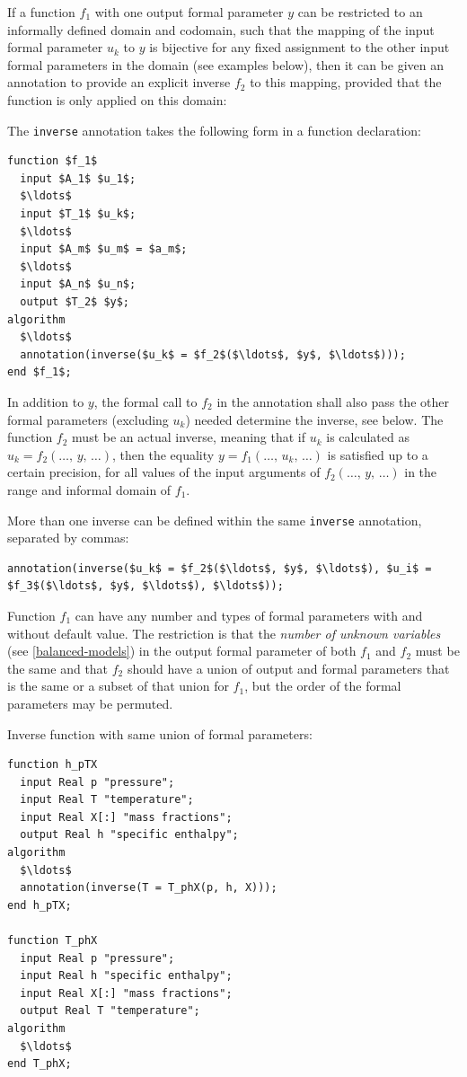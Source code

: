 If a function $f_1$ with one output formal parameter $y$ can be restricted to an informally defined domain and codomain, such that the mapping of the input formal parameter $u_{k}$ to $y$ is bijective for any fixed assignment to the other input formal parameters in the domain (see examples below), then it can be given an  annotation to provide an explicit inverse $f_2$ to this mapping, provided that the function is only applied on this domain:

The {\lstinline!inverse!} annotation takes the following form in a function declaration:
\begin{lstlisting}[language=modelica]
function $f_1$
  input $A_1$ $u_1$;
  $\ldots$
  input $T_1$ $u_k$;
  $\ldots$
  input $A_m$ $u_m$ = $a_m$;
  $\ldots$
  input $A_n$ $u_n$;
  output $T_2$ $y$;
algorithm
  $\ldots$
  annotation(inverse($u_k$ = $f_2$($\ldots$, $y$, $\ldots$)));
end $f_1$;
\end{lstlisting}

In addition to $y$, the formal call to $f_2$ in the annotation shall also pass the other formal parameters (excluding $u_{k}$) needed determine the inverse, see below.
The function $f_2$ must be an actual inverse, meaning that if $u_k$ is calculated as $u_k = f_2(\ldots,\, y,\, \ldots)$, then the equality $y = f_1(\ldots,\, u_k,\, \ldots)$ is satisfied up to a certain precision, for all values of the input arguments of $f_2(\ldots,\, y,\, \ldots)$ in the range and informal domain of $f_1$.

More than one inverse can be defined within the same {\lstinline!inverse!} annotation, separated by commas:
\begin{lstlisting}[language=modelica]
annotation(inverse($u_k$ = $f_2$($\ldots$, $y$, $\ldots$), $u_i$ = $f_3$($\ldots$, $y$, $\ldots$), $\ldots$));
\end{lstlisting}

Function $f_1$ can have any number and types of formal parameters with and without default value.
The restriction is that the \emph{number of unknown variables} (see \cref{balanced-models}) in the output formal parameter of both $f_1$ and $f_2$ must be the same and that $f_2$ should have a union of output and formal parameters that is the same or a subset of that union for $f_1$, but the order of the formal parameters may be permuted.

\begin{example}
Inverse function with same union of formal parameters:
\begin{lstlisting}[language=modelica]
function h_pTX
  input Real p "pressure";
  input Real T "temperature";
  input Real X[:] "mass fractions";
  output Real h "specific enthalpy";
algorithm
  $\ldots$
  annotation(inverse(T = T_phX(p, h, X)));
end h_pTX;

function T_phX
  input Real p "pressure";
  input Real h "specific enthalpy";
  input Real X[:] "mass fractions";
  output Real T "temperature";
algorithm
  $\ldots$
end T_phX;
\end{lstlisting}
\end{example}

